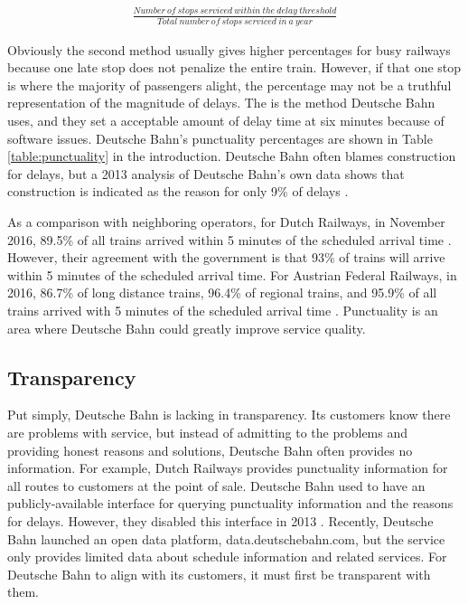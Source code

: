 \documentclass{article}
\begin{document}
\begin{align}
\frac{Number\ of\ stops\ serviced\ within\ the\ delay\ threshold}{Total\ number\ of\ stops\ serviced\ in\ a\ year}
\end{align}

Obviously the second method usually gives higher percentages for busy railways because one late stop does not penalize the entire train. However, if that one stop is where the majority of passengers alight, the percentage may not be a truthful representation of the magnitude of delays. The is the method Deutsche Bahn uses, and they set a acceptable amount of delay time at six minutes because of software issues. Deutsche Bahn's punctuality percentages are shown in Table \ref{table:punctuality} in the introduction. Deutsche Bahn often blames construction for delays, but a 2013 analysis of Deutsche Bahn's own data shows that construction is indicated as the reason for only 9\% of delays \citep{w2013}.

As a comparison with neighboring operators, for Dutch Railways, in November 2016, 89.5\% of all trains arrived within 5 minutes of the scheduled arrival time \citep{ns-howmany}. However, their agreement with the government is that 93\% of trains will arrive within 5 minutes of the scheduled arrival time. For Austrian Federal Railways, in 2016, 86.7\% of long distance trains, 96.4\% of regional trains, and 95.9\% of all trains arrived with 5 minutes of the scheduled arrival time \citep{oebb}. Punctuality is an area where Deutsche Bahn could greatly improve service quality.
\subsection{Transparency}
Put simply, Deutsche Bahn is lacking in transparency. Its customers know there are problems with service, but instead of admitting to the problems and providing honest reasons and solutions, Deutsche Bahn often provides no information. For example, Dutch Railways provides punctuality information for all routes to customers at the point of sale. Deutsche Bahn used to have an publicly-available interface for querying punctuality information and the reasons for delays. However, they disabled this interface in 2013 \citep{w2013}. Recently, Deutsche Bahn launched an open data platform, data.deutschebahn.com, but the service only provides limited data about schedule information and related services. For Deutsche Bahn to align with its customers, it must first be transparent with them.
\end{document}
